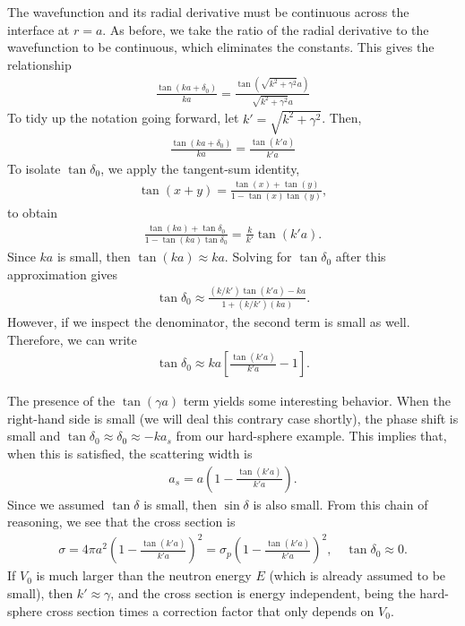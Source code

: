 The wavefunction and its radial derivative must be continuous across the interface at $r = a$. As before, we take the ratio of the radial derivative to the wavefunction to be continuous, which eliminates the constants. This gives the relationship
\begin{align}
  \frac{ \tan(ka + \delta_0) }{ ka } = \frac{ \tan( \sqrt{ k^2 + \gamma^2 } a ) }{ \sqrt{ k^2 + \gamma^2 } a  }
\end{align}
To tidy up the notation going forward, let $k' = \sqrt{k^2 + \gamma^2}$. Then,
\begin{align}
  \frac{ \tan(ka + \delta_0) }{ ka } = \frac{ \tan( k' a ) }{ k' a  } \nonumber
\end{align}
To isolate $\tan\delta_0$, we apply the tangent-sum identity,
\begin{align}
  \tan(x + y) = \frac{ \tan(x) + \tan(y) }{ 1 - \tan(x) \tan(y) }, \nonumber
\end{align}
to obtain
\begin{align}
  \frac{ \tan(ka) + \tan\delta_0 }{ 1 - \tan(ka) \tan\delta_0 } = \frac{k}{k'} \tan( k' a ) .
\end{align}
Since $ka$ is small, then $\tan(ka) \approx ka$. Solving for $\tan\delta_0$ after this approximation gives
\begin{align}
  \tan\delta_0 \approx \frac{ (k/k') \tan(k' a) - k a }{ 1 + (k/k') (ka) }.
\end{align}
However, if we inspect the denominator, the second term is small as well. Therefore, we can write
\begin{align} \label{Eq:nuclearData_tangentPhaseLowEnergyConstantPotentialWell}
  \tan\delta_0 \approx ka \left[ \frac{ \tan(k' a) }{ k' a } - 1 \right] .
\end{align}

The presence of the $\tan(\gamma a)$ term yields some interesting behavior. When the right-hand side is small (we will deal this contrary case shortly), the phase shift is small and $\tan\delta_0 \approx \delta_0 \approx -k a_s$ from our hard-sphere example. This implies that, when this is satisfied, the scattering width is
\begin{align}
  a_s = a \left( 1 - \frac{\tan(k' a)}{k' a} \right).
\end{align}
Since we assumed $\tan\delta$ is small, then $\sin\delta$ is also small. From this chain of reasoning, we see that the cross section is
\begin{align}
  \sigma = 4 \pi a^2 \left( 1 - \frac{\tan(k' a)}{k' a} \right)^2 = \sigma_p \left( 1 - \frac{\tan(k' a)}{k' a} \right)^2 , \quad \tan\delta_0 \approx 0 .
\end{align}
If $V_0$ is much larger than the neutron energy $E$ (which is already assumed to be small), then $k' \approx \gamma$, and the cross section is energy independent, being the hard-sphere cross section times a correction factor that only depends on $V_0$.

